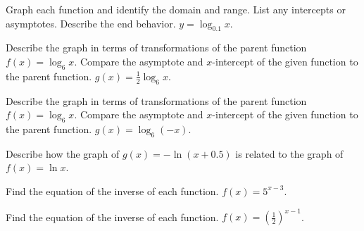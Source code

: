 \documentclass{article}
\newenvironment{practice}[2]{}{}        %
\newcommand{\answer}[1]{}               %
\begin{document}
\begin{practice}{17}{2}
Graph each function and identify the domain and range. List any intercepts or asymptotes. Describe the end behavior. $y=\log_{0.1}x$.
\answer{\begin{tikzpicture}
\begin{axis}[width=6cm,height=5cm,axis lines=middle,xmin=0,xmax=80,ymin=-4,ymax=1,xtick={0,20,40,60,80},ytick={-3,-2,-1,0},xlabel={$x$},ylabel={$y$},grid=both]
\addplot[red,thick,domain=0.05:80,samples=100] {ln(x)/ln(0.1)};
\draw[dashed] (axis cs:0,-4)--(axis cs:0,1) node[pos=0.95,right] {$x=0$};
\end{axis}
\end{tikzpicture}

Domain: $\{x\mid x>0\}$; range: all real numbers; intercept: $x$-intercept 1; asymptote: $y$-axis; end behavior: As $x\to0$, $y\to\infty$. As $x\to\infty$, $y\to-\infty$.}
\end{practice}

\begin{practice}{18}{2}
Describe the graph in terms of transformations of the parent function $f(x)=\log_6 x$. Compare the asymptote and $x$-intercept of the given function to the parent function. $g(x)=\frac12\log_6 x$.
\answer{Vertical shrink of $\frac12$; asymptote: $y$-axis (same as parent function); $x$-intercept 1 (same as parent function).}
\end{practice}

\begin{practice}{19}{1}
Describe the graph in terms of transformations of the parent function $f(x)=\log_6 x$. Compare the asymptote and $x$-intercept of the given function to the parent function. $g(x)=\log_6(-x)$.
\answer{Reflection over the $y$-axis; asymptote: $y$-axis (same as parent function); $x$-intercept $-1$ (different from parent function).}
\end{practice}

\begin{practice}{20}{1}
Describe how the graph of $g(x)=-\ln(x+0.5)$ is related to the graph of $f(x)=\ln x$.
\answer{Reflection of $f(x)$ shifted 0.5 units to the left.}
\end{practice}

\begin{practice}{21}{1}
Find the equation of the inverse of each function. $f(x)=5^{x-3}$.
\answer{$f^{-1}(x)=\log_5x+3$}
\end{practice}

\begin{practice}{22}{1}
Find the equation of the inverse of each function. $f(x)=\left(\frac12\right)^{x-1}$.
\answer{$f^{-1}(x)=\log_{\frac12}x+1$}
\end{practice}
\end{document}
